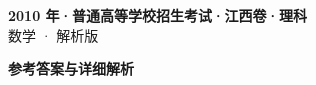 \documentclass[zihao=-4, a4paper]{ctexart}
\begin{document}
\begin{center}
  {\Large\bfseries 2010 年·普通高等学校招生考试·江西卷·理科}\\[4pt]
  {\large 数学 · 解析版}
\end{center}
\medskip
{}

\clearpage
{}
\begin{center}{\Large\bfseries 参考答案与详细解析}\end{center}
\medskip

\end{document}
